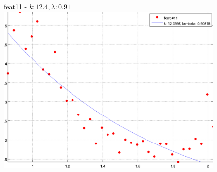 \documentclass[12pt]{report}
\begin{document}
\begin{figure}[H]
\begin{minipage}[t]{0.5\linewidth}
	\centering
	feat11 - $k: 12.4, \lambda: 0.91 $\\
	\includegraphics[scale=\imFeat]{images/feat11}\\



\end{minipage}
\end{figure}
\end{document}
